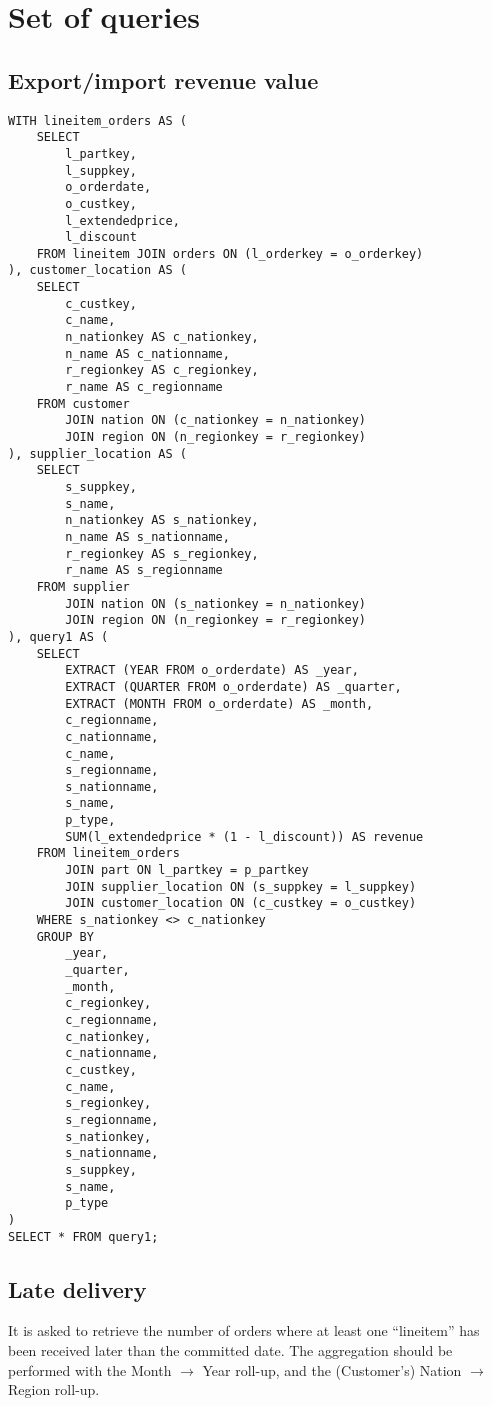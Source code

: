 

\section{Set of queries}

\subsection{Export/import revenue value}

\begin{lstlisting}
WITH lineitem_orders AS (
	SELECT 
		l_partkey, 
		l_suppkey, 
		o_orderdate, 
		o_custkey, 
		l_extendedprice, 
		l_discount
	FROM lineitem JOIN orders ON (l_orderkey = o_orderkey)
), customer_location AS (
	SELECT 
		c_custkey, 
		c_name, 
		n_nationkey AS c_nationkey, 
		n_name AS c_nationname, 
		r_regionkey AS c_regionkey, 
		r_name AS c_regionname 
	FROM customer 
		JOIN nation ON (c_nationkey = n_nationkey)
		JOIN region ON (n_regionkey = r_regionkey)
), supplier_location AS (
	SELECT 
		s_suppkey, 
		s_name, 
		n_nationkey AS s_nationkey, 
		n_name AS s_nationname, 
		r_regionkey AS s_regionkey, 
		r_name AS s_regionname 
	FROM supplier 
		JOIN nation ON (s_nationkey = n_nationkey)
		JOIN region ON (n_regionkey = r_regionkey)
), query1 AS (
	SELECT
		EXTRACT (YEAR FROM o_orderdate) AS _year,
		EXTRACT (QUARTER FROM o_orderdate) AS _quarter,
		EXTRACT (MONTH FROM o_orderdate) AS _month,
		c_regionname,
		c_nationname,
		c_name,
		s_regionname,
		s_nationname,
		s_name,
		p_type,
		SUM(l_extendedprice * (1 - l_discount)) AS revenue
	FROM lineitem_orders 
		JOIN part ON l_partkey = p_partkey
		JOIN supplier_location ON (s_suppkey = l_suppkey)
		JOIN customer_location ON (c_custkey = o_custkey)
	WHERE s_nationkey <> c_nationkey
	GROUP BY
		_year,
		_quarter,
		_month,
		c_regionkey,
		c_regionname,
		c_nationkey,
		c_nationname,
		c_custkey,
		c_name,
		s_regionkey,
		s_regionname,
		s_nationkey,
		s_nationname,
		s_suppkey,
		s_name,
		p_type
)
SELECT * FROM query1;
\end{lstlisting}


\subsection{Late delivery}

It is asked to retrieve the number of orders where at least one ``lineitem'' has been received later than the committed date.
The aggregation should be performed with the Month $\rightarrow$ Year roll-up, and the (Customer's) Nation $\rightarrow$ Region roll-up.

